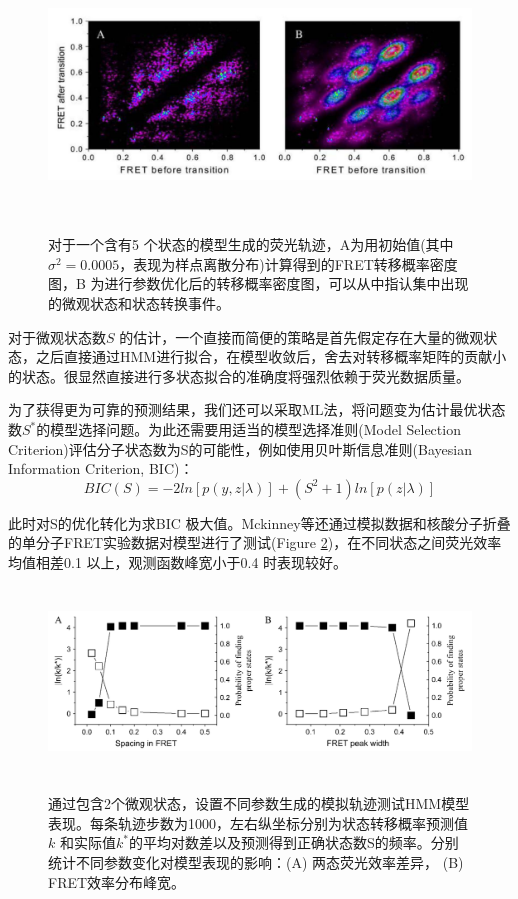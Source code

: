 \documentclass[11pt, a4paper]{article}
\begin{document}
\begin{figure}[htb]
  \centering
  \includegraphics[height=6.5cm]{Fig_tdp.PNG}\\
  \caption{对于一个含有5 个状态的模型生成的荧光轨迹，A为用初始值(其中$\sigma^2=0.0005$，表现为样点离散分布)计算得到的FRET转移概率密度图，B 为进行参数优化后的转移概率密度图，可以从中指认集中出现的微观状态和状态转换事件。}
  \label{fig:tdp}
\end{figure}


对于微观状态数$S$ 的估计，一个直接而简便的策略是首先假定存在大量的微观状态，之后直接通过HMM进行拟合，在模型收敛后，舍去对转移概率矩阵的贡献小的状态。很显然直接进行多状态拟合的准确度将强烈依赖于荧光数据质量。

为了获得更为可靠的预测结果，我们还可以采取ML法，将问题变为估计最优状态数$S^*$的模型选择问题。为此还需要用适当的模型选择准则(Model Selection Criterion)评估分子状态数为S的可能性，例如使用贝叶斯信息准则(Bayesian Information Criterion, BIC)：
\begin{equation}
BIC(S)=-2ln[p(y,z|\lambda)]+(S^2+1)ln[p(z|\lambda)]
\end{equation}

此时对S的优化转化为求BIC 极大值。Mckinney等还通过模拟数据和核酸分子折叠的单分子FRET实验数据对模型进行了测试(Figure \ref{fig:test})，在不同状态之间荧光效率均值相差0.1 以上，观测函数峰宽小于0.4 时表现较好。

\begin{figure}[htb]
  \centering
  \includegraphics[height=5cm]{Fig_test.PNG}\\
  \caption{通过包含2个微观状态，设置不同参数生成的模拟轨迹测试HMM模型表现。每条轨迹步数为1000，左右纵坐标分别为状态转移概率预测值$k$ 和实际值$k^*$的平均对数差以及预测得到正确状态数S的频率。分别统计不同参数变化对模型表现的影响：(A) 两态荧光效率差异， (B) FRET效率分布峰宽。}%
  \label{fig:test}
\end{figure}
\end{document}
